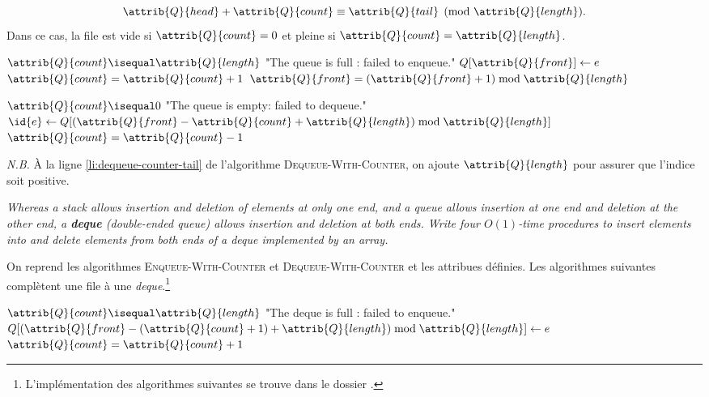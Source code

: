 \begin{description}
\begin{ex}
\begin{enumerate}[label=\circled{\arabic*}]
        \[\attrib{Q}{head} + \attrib{Q}{count}\equiv \attrib{Q}{tail}\pmod{\attrib{Q}{length}}.\]
    Dans ce cas, la file est vide si $\attrib{Q}{count} = 0$ et pleine si $\attrib{Q}{count} = \attrib{Q}{length}$. 
\begin{codebox}
    \li \If $\attrib{Q}{count}\isequal\attrib{Q}{length}$ \Then
        \li \Error "The queue is full : failed to enqueue." \End
    \li  $Q[\attrib{Q}{front}] \gets e$ 
    \li $\attrib{Q}{count} = \attrib{Q}{count}+1$
    \li $\attrib{Q}{front} = (\attrib{Q}{front}+1)\bmod \attrib{Q}{length}$
\end{codebox}
\begin{codebox}
    \li \If $\attrib{Q}{count}\isequal0$ \Then
        \li \Error "The queue is empty: failed to dequeue." \End
    \li  $\id{e} \gets Q[(\attrib{Q}{front} - \attrib{Q}{count} + \attrib{Q}{length}) \bmod \attrib{Q}{length}]$ \label{li:dequeue-counter-tail}
    \li  $\attrib{Q}{count} = \attrib{Q}{count}-1$
    \li \Return {}
\end{codebox}
\textit{N.B.} À la ligne \ref{li:dequeue-counter-tail} de l'algorithme \textsc{Dequeue-With-Counter}, on ajoute $\attrib{Q}{length}$ pour assurer que l'indice soit positive. 
  \end{enumerate} 
\end{ex}
 \textit{Whereas a stack allows insertion and deletion of elements at only one end, and a queue allows insertion at one end and deletion at the other end, a \textbf{deque} (double-ended queue) allows insertion and deletion at both ends. Write four $O(1)$-time procedures to insert elements into and delete elements from both ends of a deque implemented by an array.}
\begin{ex}
   On reprend les algorithmes \textsc{Enqueue-With-Counter} et \textsc{Dequeue-With-Counter} et les attribues définies. Les algorithmes suivantes complètent une file à une \textit{deque}.\footnote{L'implémentation des algorithmes suivantes se trouve dans le dossier .}
\begin{codebox}
    \li \If $\attrib{Q}{count}\isequal\attrib{Q}{length}$ \Then
        \li \Error "The deque is full : failed to enqueue." \End
    \li  $Q[(\attrib{Q}{front} - (\attrib{Q}{count} + 1) + \attrib{Q}{length}) \bmod \attrib{Q}{length}] \gets e$ 
    \li $\attrib{Q}{count} = \attrib{Q}{count}+1$

\end{codebox}
\end{ex}
\end{description}
